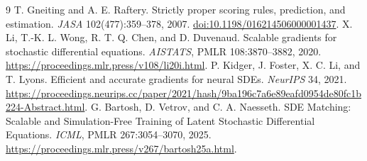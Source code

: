 \documentclass[11pt]{article}
\begin{document}
\begin{thebibliography}{9}
 T. Gneiting and A. E. Raftery. Strictly proper scoring rules, prediction, and estimation. \emph{JASA} 102(477):359--378, 2007. \href{https://doi.org/10.1198/016214506000001437}{doi:10.1198/016214506000001437}.
 X. Li, T.-K. L. Wong, R. T. Q. Chen, and D. Duvenaud. Scalable gradients for stochastic differential equations. \emph{AISTATS}, PMLR 108:3870--3882, 2020. \url{https://proceedings.mlr.press/v108/li20i.html}.
 P. Kidger, J. Foster, X. C. Li, and T. Lyons. Efficient and accurate gradients for neural SDEs. \emph{NeurIPS} 34, 2021. \url{https://proceedings.neurips.cc/paper/2021/hash/9ba196c7a6e89eafd0954de80fc1b224-Abstract.html}.
 G. Bartosh, D. Vetrov, and C. A. Naesseth. SDE Matching: Scalable and Simulation-Free Training of Latent Stochastic Differential Equations. \emph{ICML}, PMLR 267:3054--3070, 2025. \url{https://proceedings.mlr.press/v267/bartosh25a.html}.
\end{thebibliography}
\end{document}
